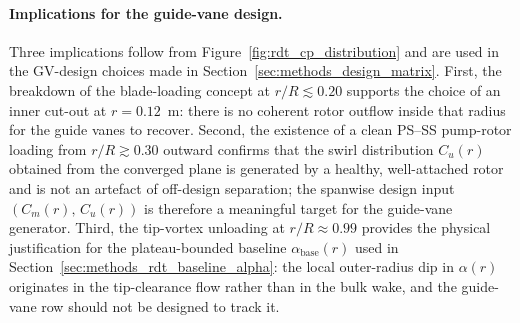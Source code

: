 \paragraph{Implications for the guide-vane design.}
Three implications follow from Figure~\ref{fig:rdt_cp_distribution} and
are used in the GV-design choices made in
Section~\ref{sec:methods_design_matrix}. First, the breakdown of the
blade-loading concept at $r/R\lesssim 0.20$ supports the choice of an
inner cut-out at $r=0.12$~m: there is no coherent rotor outflow inside
that radius for the guide vanes to recover. Second, the existence of a
clean PS--SS pump-rotor loading from $r/R\gtrsim 0.30$ outward confirms
that the swirl distribution $C_u(r)$ obtained from the converged plane
is generated by a healthy, well-attached rotor and is not an artefact
of off-design separation; the spanwise design input
$(C_m(r),\,C_u(r))$ is therefore a meaningful target for the guide-vane
generator. Third, the tip-vortex unloading at $r/R\approx 0.99$
provides the physical justification for the plateau-bounded baseline
$\alpha_{\mathrm{base}}(r)$ used in
Section~\ref{sec:methods_rdt_baseline_alpha}: the local outer-radius
dip in $\alpha(r)$ originates in the tip-clearance flow rather than in
the bulk wake, and the guide-vane row should not be designed to track
it.


 
 
